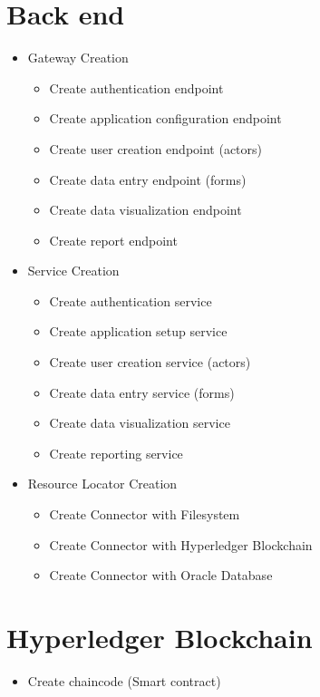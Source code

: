 \section{Back end}\label{sec:BackendActivities}
\begin{itemize}
\item Gateway Creation
    \begin{itemize}
    \item Create authentication endpoint
    \item Create application configuration endpoint
    \item Create user creation endpoint (actors)
    \item Create data entry endpoint (forms)
    \item Create data visualization endpoint
    \item Create report endpoint
    \end{itemize}
\item Service Creation
    \begin{itemize}
    \item Create authentication service
    \item Create application setup service
    \item Create user creation service (actors)
    \item Create data entry service (forms)
    \item Create data visualization service
    \item Create reporting service
    \end{itemize}
\item Resource Locator Creation
    \begin{itemize}
    \item Create Connector with Filesystem
    \item Create Connector with Hyperledger Blockchain
    \item Create Connector with Oracle Database
    \end{itemize}
\end{itemize}

\section{Hyperledger Blockchain}\label{sec:HyperledgerBlockchain}
\begin{itemize}
\item Create chaincode (Smart contract)
\end{itemize}
